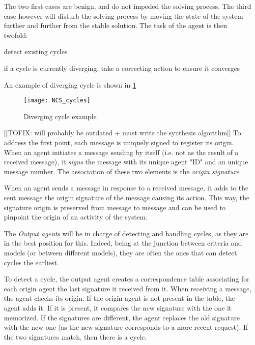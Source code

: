 The two first cases are benign, and do not impeded the solving process. The third case however will disturb the solving process by moving the state of the system further and further from the stable solution. The task of the agent is then twofold:
\begin{compactenum}
\item detect existing cycles
\item if a cycle is currently diverging, take a correcting action to ensure it converges
\end{compactenum}

An example of diverging cycle is shown in \figurename{} \ref{NCS_cycles}

\begin{figure}
\centering
\texttt{[image: NCS\_cycles]}
\caption{Diverging cycle example}\label{NCS_cycles}
\end{figure}

[[TOFIX: will probably be outdated + must write the synthesis algorithm]]
To address the first point, each message is uniquely signed to register its origin. When an agent initiates a message sending by itself (i.e. not as the result of a received message), it \emph{signs} the message with its unique agent "ID" and an unique message number. The association of these two elements is the \emph{origin signature}.

When an agent sends a message in response to a received message, it adds to the sent message the origin signature of the message causing its action. This way, the signature origin is preserved from message to message and can be used to pinpoint the origin of an activity of the system.

The \emph{Output agents} will be in charge of detecting and handling cycles, as they are in the best position for this. Indeed, being at the junction between criteria and models (or between different models), they are often the ones that can detect cycles the earliest.

To detect a cycle,  the output agent creates a correspondence table associating for each origin agent the last signature it received from it. When receiving a message, the agent checks its origin. If the origin agent is not present in the table, the agent adds it. If it is present, it compares the new signature with the one it memorized. If the signatures are different, the agent replaces the old signature with the new one (as the new signature corresponds to a more recent request). If the two signatures match, then there is a cycle.


